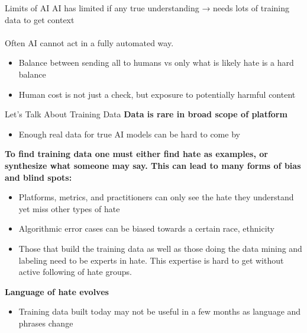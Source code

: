 \documentclass[nobackground,dvipsnames,table,aspectratio=169]{beamer}
\begin{document}
\begin{frame}{Limits of AI}
    \small
    AI has limited if any true understanding → needs lots of training data to get context\\~\\

    Often AI cannot act in a fully automated way.
    \begin{itemize}
        \item Balance between sending all to humans vs only what is likely hate is a hard balance
        \item Human cost is not just a check, but exposure to potentially harmful content
    \end{itemize}
\end{frame}

\begin{frame}{Let's Talk About Training Data}
    \footnotesize
    \textbf{Data is rare in broad scope of platform}
    \begin{itemize}
        \item Enough real data for true AI models can be hard to come by
    \end{itemize}
    
    \textbf{To find training data one must either find hate as examples, or synthesize what someone may say.  This can lead to many forms of bias and blind spots:}
    \begin{itemize}
        \item Platforms, metrics, and practitioners can only see the hate they understand yet miss other types of hate
        \item Algorithmic error cases can be biased towards a certain race, ethnicity
        \item Those that build the training data as well as those doing the data mining and labeling need to be experts in hate. This expertise is hard to get without active following of hate groups.
    \end{itemize}
    
    \textbf{Language of hate evolves}
    \begin{itemize}
        \item Training data built today may not be useful in a few months as language and phrases change
    \end{itemize}
\end{frame}
\end{document}
